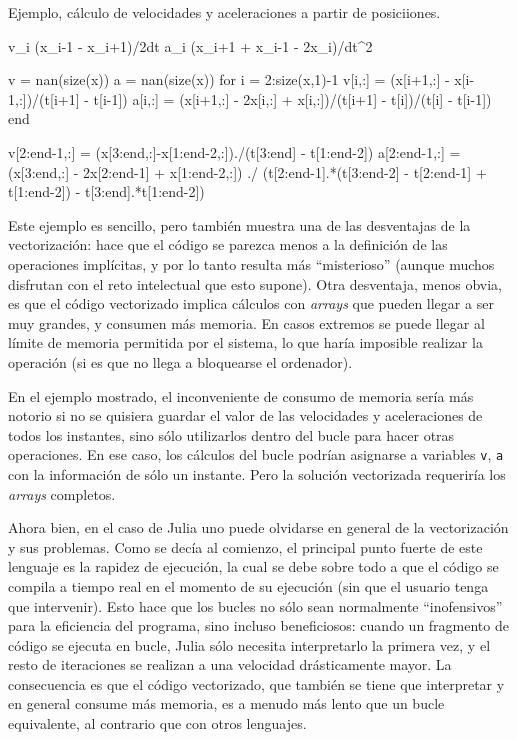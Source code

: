 ﻿\documentclass[spanish]{article}
\begin{document}
Ejemplo, cálculo de velocidades y aceleraciones a partir de posiciiones.

v_i \approx (x_{i-1} - x_{i+1})/2dt
a_i \approx (x_i+1 + x_i-1 - 2x_i)/dt^2


v = nan(size(x))
a = nan(size(x))
for i = 2:size(x,1)-1
  v[i,:] = (x[i+1,:] - x[i-1,:])/(t[i+1] - t[i-1])
  a[i,:] = (x[i+1,:] - 2x[i,:] + x[i,:])/(t[i+1] - t[i])/(t[i] - t[i-1])
end

v[2:end-1,:] = (x[3:end,:]-x[1:end-2,:])./(t[3:end] - t[1:end-2])
a[2:end-1,:] = (x[3:end,:] - 2x[2:end-1] + x[1:end-2,:]) ./
  (t[2:end-1].*(t[3:end-2] - t[2:end-1] + t[1:end-2]) - t[3:end].*t[1:end-2])

Este ejemplo es sencillo, pero también muestra una de las desventajas de
la vectorización: hace que el código se parezca menos a la definición
de las operaciones implícitas, y por lo tanto resulta más ``misterioso''
(aunque muchos disfrutan con el reto intelectual que esto supone).
Otra desventaja, menos obvia, es que el código vectorizado implica
cálculos con \emph{arrays} que pueden llegar a ser muy grandes, y
consumen más memoria. En casos extremos se puede llegar al límite
de memoria permitida por el sistema, lo que haría imposible
realizar la operación (si es que no llega a bloquearse el ordenador).

En el ejemplo mostrado, el inconveniente de consumo de memoria sería
más notorio si no se quisiera guardar el valor de las velocidades y
aceleraciones de todos los instantes, sino sólo utilizarlos dentro
del bucle para hacer otras operaciones. En ese caso, los cálculos del bucle
podrían asignarse a variables \texttt{v}, \texttt{a} con la información de sólo
un instante. Pero la solución vectorizada requeriría los \emph{arrays}
completos.

Ahora bien, en el caso de Julia uno puede olvidarse en general
de la vectorización y sus problemas. Como se decía al comienzo, el principal punto
fuerte de este lenguaje es la rapidez de ejecución, la cual se debe
sobre todo a que el código se compila a tiempo real en el momento de
su ejecución (sin que el usuario tenga que intervenir). Esto hace
que los bucles no sólo sean normalmente ``inofensivos'' para la
eficiencia del programa, sino incluso beneficiosos: cuando un
fragmento de código se ejecuta en bucle, Julia sólo necesita
interpretarlo la primera vez, y el resto de iteraciones se realizan
a una velocidad drásticamente mayor. La consecuencia es que
el código vectorizado, que también se tiene que interpretar y
en general consume más memoria, es a menudo más lento que un bucle
equivalente, al contrario que con otros lenguajes.
\end{document}
